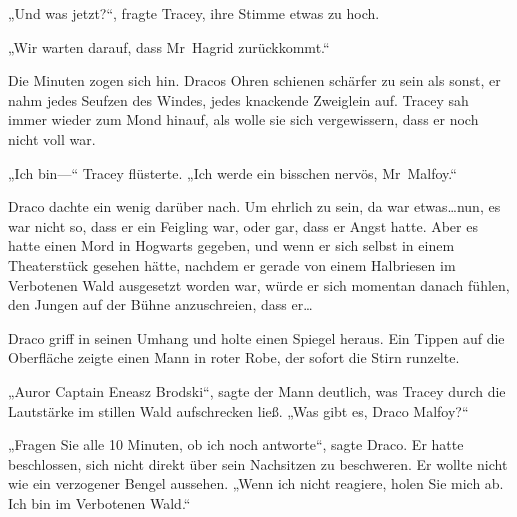 „Und was jetzt?“, fragte Tracey, ihre Stimme etwas zu hoch.

„Wir warten darauf, dass Mr~Hagrid zurückkommt.“

Die Minuten zogen sich hin. Dracos Ohren schienen schärfer zu sein als sonst, er nahm jedes Seufzen des Windes, jedes knackende Zweiglein auf. Tracey sah immer wieder zum Mond hinauf, als wolle sie sich vergewissern, dass er noch nicht voll war.

„Ich bin—“ Tracey flüsterte. „Ich werde ein bisschen nervös, Mr~Malfoy.“

Draco dachte ein wenig darüber nach. Um ehrlich zu sein, da war etwas…nun, es war nicht so, dass er ein Feigling war, oder gar, dass er Angst hatte. Aber es hatte einen Mord in Hogwarts gegeben, und wenn er sich selbst in einem Theaterstück gesehen hätte, nachdem er gerade von einem Halbriesen im Verbotenen Wald ausgesetzt worden war, würde er sich momentan danach fühlen, den Jungen auf der Bühne anzuschreien, dass er…

Draco griff in seinen Umhang und holte einen Spiegel heraus. Ein Tippen auf die Oberfläche zeigte einen Mann in roter Robe, der sofort die Stirn runzelte.

„Auror Captain Eneasz Brodski“, sagte der Mann deutlich, was Tracey durch die Lautstärke im stillen Wald aufschrecken ließ. „Was gibt es, Draco Malfoy?“

„Fragen Sie alle 10 Minuten, ob ich noch antworte“, sagte Draco. Er hatte beschlossen, sich nicht direkt über sein Nachsitzen zu beschweren. Er wollte nicht wie ein verzogener Bengel aussehen. „Wenn ich nicht reagiere, holen Sie mich ab. Ich bin im Verbotenen Wald.“

